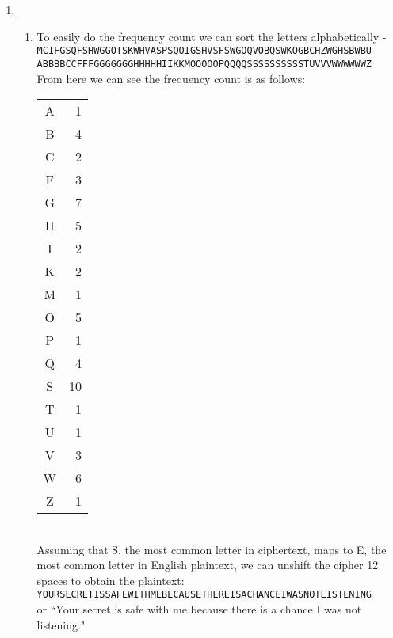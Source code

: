 \documentclass[12pt,letterpaper]{article}
\begin{document}
\begin{enumerate}
    \item
    \begin{enumerate}
    \item
        To easily do the frequency count we can sort the letters alphabetically - \\
        {\tt MCIFGSQFSHWGGOTSKWHVASPSQOIGSHVSFSWGOQVOBQSWKOGBCHZWGHSBWBU}\\
        {\tt ABBBBCCFFFGGGGGGGHHHHHIIKKMOOOOOPQQQQSSSSSSSSSSTUVVVWWWWWWZ}\\
        From here we can see the frequency count is as follows:\\
        \begin{tabular}{cr}
            A &  1 \\
            B &  4 \\
            C &  2 \\
            F &  3 \\
            G &  7 \\
            H &  5 \\
            I &  2 \\
            K &  2 \\
            M &  1 \\
            O &  5 \\
            P &  1 \\
            Q &  4 \\
            S & 10 \\
            T &  1 \\
            U &  1 \\
            V &  3 \\
            W &  6 \\
            Z &  1 \\
        \end{tabular}\\
        Assuming that S, the most common letter in ciphertext, maps to E, the most common letter in English plaintext, we can unshift the cipher 12 spaces to obtain the plaintext:\\
        {\tt YOURSECRETISSAFEWITHMEBECAUSETHEREISACHANCEIWASNOTLISTENING}\\
        or ``Your secret is safe with me because there is a chance I was not listening."
    \end{enumerate}



\end{enumerate}
\end{document}
